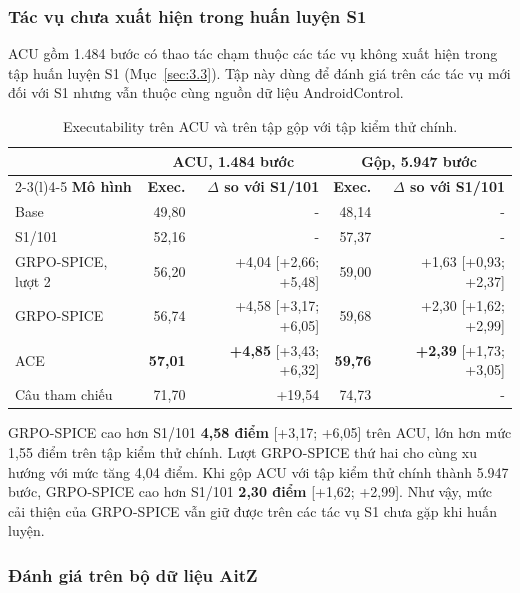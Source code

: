 \subsubsection{Tác vụ chưa xuất hiện trong huấn luyện S1}\label{sec:6.acu}

ACU gồm 1.484 bước có thao tác chạm thuộc các tác vụ không xuất hiện trong tập huấn luyện S1 (Mục~\ref{sec:3.3}). Tập này dùng để đánh giá trên các tác vụ mới đối với S1 nhưng vẫn thuộc cùng nguồn dữ liệu AndroidControl.

\begin{table}[htbp]
\centering\small
\caption{Executability trên ACU và trên tập gộp với tập kiểm thử chính.}\label{tab:6.acu}
\setlength{\tabcolsep}{4pt}
\begin{tabular}{@{}lrrrr@{}}
\toprule
 & \multicolumn{2}{c}{\textbf{ACU, 1.484 bước}} & \multicolumn{2}{c}{\textbf{Gộp, 5.947 bước}} \\
\cmidrule(lr){2-3}\cmidrule(l){4-5}
\textbf{Mô hình} & \textbf{Exec.} & \textbf{$\Delta$ so với S1/101} & \textbf{Exec.} & \textbf{$\Delta$ so với S1/101} \\
\midrule
Base & 49,80 & - & 48,14 & - \\
S1/101 & 52,16 & - & 57,37 & - \\
GRPO-SPICE, lượt 2 & 56,20 & +4,04 [+2,66; +5,48] & 59,00 & +1,63 [+0,93; +2,37] \\
GRPO-SPICE & 56,74 & +4,58 [+3,17; +6,05] & 59,68 & +2,30 [+1,62; +2,99] \\
ACE & \textbf{57,01} & \textbf{+4,85} [+3,43; +6,32] & \textbf{59,76} & \textbf{+2,39} [+1,73; +3,05] \\
\midrule
Câu tham chiếu & 71,70 & +19,54 & 74,73 & - \\
\bottomrule
\end{tabular}
\end{table}

GRPO-SPICE cao hơn S1/101 \textbf{4,58 điểm} [+3,17; +6,05] trên ACU, lớn hơn mức 1,55 điểm trên tập kiểm thử chính. Lượt GRPO-SPICE thứ hai cho cùng xu hướng với mức tăng 4,04 điểm. Khi gộp ACU với tập kiểm thử chính thành 5.947 bước, GRPO-SPICE cao hơn S1/101 \textbf{2,30 điểm} [+1,62; +2,99]. Như vậy, mức cải thiện của GRPO-SPICE vẫn giữ được trên các tác vụ S1 chưa gặp khi huấn luyện.

\subsubsection{Đánh giá trên bộ dữ liệu AitZ}\label{sec:6.aitz}

